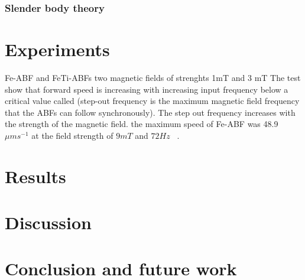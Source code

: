 \documentclass[12pt,a4paper,titlepage]{report}
\begin{document}
\subsection{Slender body theory}\label{method1}



\chapter{Experiments}


Fe-ABF and FeTi-ABFs 
two magnetic fields of strenghts 1mT and 3 mT
The test show that forward speed is increasing with increasing input frequency below a critical value
 called (step-out frequency is the maximum magnetic field frequency that the ABFs can follow synchronously).
The step out frequency increases with the strength of the magnetic field. the maximum speed of Fe-ABF was
48.9 $\mu ms^{-1}$ at the field strength of $9 mT$ and $72 Hz$ ~\citep{qiu2014noncytotoxic}.


\chapter{Results}



\chapter{Discussion}




\chapter{Conclusion and future work}






\renewcommand{\bibname}{References}

 
\end{document}
